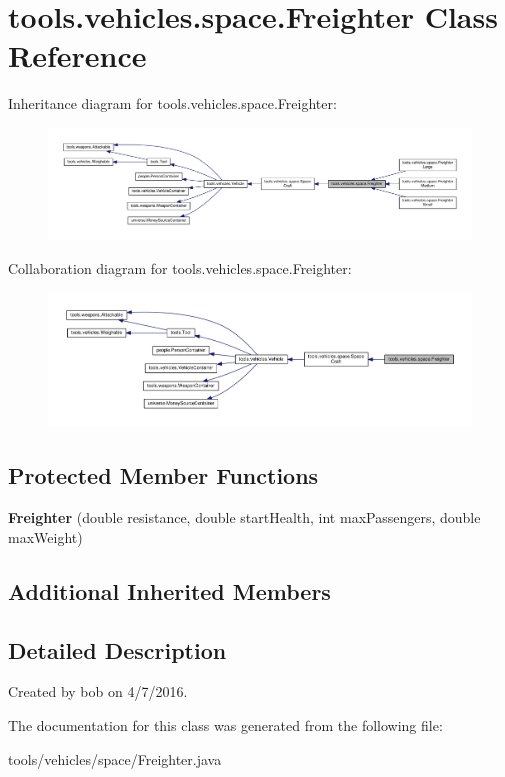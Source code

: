 \hypertarget{classtools_1_1vehicles_1_1space_1_1_freighter}{}\section{tools.\+vehicles.\+space.\+Freighter Class Reference}
\label{classtools_1_1vehicles_1_1space_1_1_freighter}


Inheritance diagram for tools.\+vehicles.\+space.\+Freighter\+:
\nopagebreak
\begin{figure}[H]
\begin{center}
\leavevmode
\includegraphics[width=350pt]{classtools_1_1vehicles_1_1space_1_1_freighter__inherit__graph}
\end{center}
\end{figure}


Collaboration diagram for tools.\+vehicles.\+space.\+Freighter\+:
\nopagebreak
\begin{figure}[H]
\begin{center}
\leavevmode
\includegraphics[width=350pt]{classtools_1_1vehicles_1_1space_1_1_freighter__coll__graph}
\end{center}
\end{figure}
\subsection*{Protected Member Functions}
\begin{DoxyCompactItemize}
\item 
{\bfseries Freighter} (double resistance, double start\+Health, int max\+Passengers, double max\+Weight)\hypertarget{classtools_1_1vehicles_1_1space_1_1_freighter_a4671e202bd8d768770ca689f391c66e7}{}\label{classtools_1_1vehicles_1_1space_1_1_freighter_a4671e202bd8d768770ca689f391c66e7}

\end{DoxyCompactItemize}
\subsection*{Additional Inherited Members}


\subsection{Detailed Description}
Created by bob on 4/7/2016. 

The documentation for this class was generated from the following file\+:\begin{DoxyCompactItemize}
\item 
tools/vehicles/space/Freighter.\+java\end{DoxyCompactItemize}
